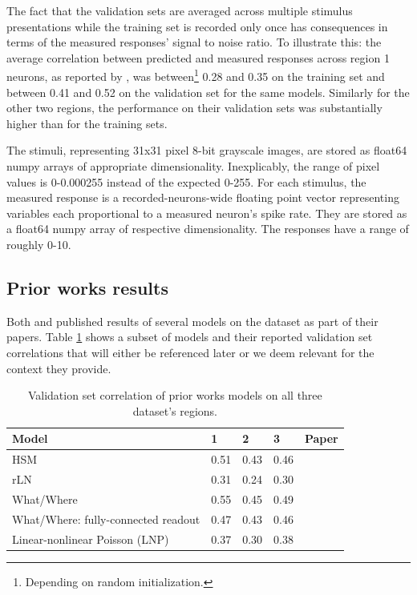 The fact that the validation sets are averaged across multiple stimulus presentations while the training set is recorded only once has consequences in terms of the measured responses’ signal to noise ratio. To illustrate this: the average correlation between predicted and measured responses across region 1 neurons, as reported by \cite{antolik}, was between\footnote{Depending on random initialization.} 0.28 and 0.35 on the training set and between 0.41 and 0.52 on the validation set for the same models. Similarly for the other two regions, the performance on their validation sets was substantially higher than for the training sets. 

The stimuli, representing 31x31 pixel 8-bit grayscale images, are stored as float64 numpy arrays of appropriate dimensionality. Inexplicably, the range of pixel values is 0-0.000255 instead of the expected 0-255. For each stimulus, the measured response is a recorded-neurons-wide floating point vector representing variables each proportional to a measured neuron’s spike rate. They are stored as a float64 numpy array of respective dimensionality. The responses have a range of roughly 0-10.

\subsection{Prior works results}\label{ch:4.1.2}

Both \cite{antolik} and \cite{klindt} published results of several models on the \citeauthor{antolik} dataset as part of their papers. Table \ref{tab:4.2} shows a subset of models and their reported validation set correlations that will either be referenced later or we deem relevant for the context they provide.

\begin{table}[ht]
    \renewcommand{\arraystretch}{1.0}
    \centering
    \begin{tabular}{l|l|l|l|l}
        \toprule
        \textbf{Model} & \textbf{1} & \textbf{2} & \textbf{3} & \textbf{Paper} \\ \midrule
        HSM & 0.51 & 0.43 & 0.46 & \citeauthor{antolik} \\ 
        rLN & 0.31 & 0.24 & 0.30 & \citeauthor{antolik} \\ 
        What/Where & 0.55 & 0.45 & 0.49 & \citeauthor{antolik} \\ 
        What/Where: fully-connected readout & 0.47 & 0.43 & 0.46 & \citeauthor{klindt} \\ 
        Linear-nonlinear Poisson (LNP) & 0.37 & 0.30 & 0.38 & \citeauthor{klindt} \\ \bottomrule
    \end{tabular}
    \caption[Performance of prior works.]{Validation set correlation of prior works models on all three dataset’s regions.}
    \label{tab:4.2}
    \renewcommand{\arraystretch}{1.0}
\end{table}

